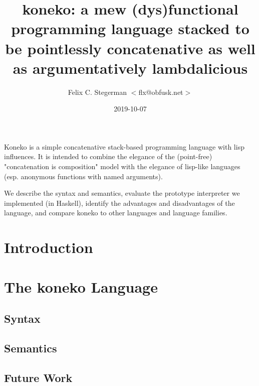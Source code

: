 \documentclass[a4paper,twocolumn]{article}
\title{
  koneko: a mew (dys)functional programming language stacked to be
  pointlessly concatenative as well as argumentatively lambdalicious
}
\author{Felix C. Stegerman $<$flx@obfusk.net$>$}
\date{2019-10-07}
\begin{document}
\maketitle

\abstract

Koneko is a simple concatenative stack-based programming language with
lisp influences.  It is intended to combine the elegance of the
(point-free) "concatenation is composition" model with the elegance of
lisp-like languages (esp. anonymous functions with named arguments).

We describe the syntax and semantics, evaluate the prototype
interpreter we implemented (in Haskell), identify the advantages and
disadvantages of the language, and compare koneko to other languages
and language families.

\section{Introduction}

%



\section{The koneko Language}

\subsection*{Syntax}

\subsection*{Semantics}

\subsection*{Future Work}
\end{document}
